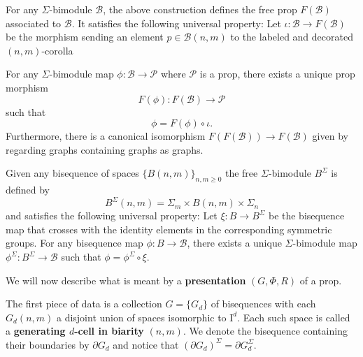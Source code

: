 \documentclass{amsart}
\newcommand{\I}{\mathrm{I}}
\renewcommand{\P}{\mathcal{P}}
\newcommand{\B}{\mathcal{B}}
\renewcommand{\1}{\mathbf{1}}
\theoremstyle{definition}
\begin{document}
For any $\Sigma$-bimodule $\B$, the above construction defines the free prop $F(\B)$ associated to $\B$. It satisfies the following universal property: Let $\iota : \B \to F(\B)$ be the morphism sending an element $p \in \B(n,m)$ to the labeled and decorated $(n,m)$-corolla
\begin{center}
\end{center}
For any $\Sigma$-bimodule map $\phi : \B \to \P$ where $\P$ is a prop, there exists a unique prop morphism 
\begin{equation*}
F(\phi) : F(\B) \to \P
\end{equation*} 
such that 
\begin{equation*}
\phi = F(\phi) \circ \iota.
\end{equation*}
Furthermore, there is a canonical isomorphism $F(F(\B)) \to F(\B)$ given by regarding graphs containing graphs as graphs.

Given any bisequence of spaces $\big\{ B(n,m) \big\}_{n,m \geq 0}$ the free $\Sigma$-bimodule $B^\Sigma$ is defined by 
\begin{equation*}
B^\Sigma(n,m) = \Sigma_m \times B(n,m) \times \Sigma_n
\end{equation*}
and satisfies the following universal property: Let $\xi : B \to B^\Sigma$ be the bisequence map that crosses with the identity elements in the corresponding symmetric groups. For any bisequence map $\phi : B \to \B$, there exists a unique $\Sigma$-bimodule map $\phi^\Sigma : B^\Sigma \to \B$ such that $\phi = \phi^\Sigma \circ \xi$.

We will now describe what is meant by a \textbf{presentation} $(G,\Phi, R)$ of a prop. 

The first piece of data is a collection $G=\{G_d\}$ of bisequences with each $G_d(n,m)$ a disjoint union of spaces isomorphic to $\I^d$. Each such space is called a \textbf{generating $d$-cell in biarity} $(n,m)$. We denote the bisequence containing their boundaries by $\partial G_d$ and notice that $(\partial G_d)^\Sigma = \partial G_d^\Sigma$. 
\end{document}
